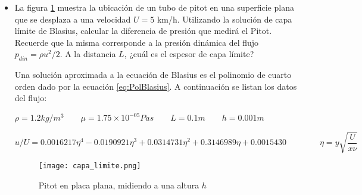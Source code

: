 \begin{itemize}
\item La figura \ref{fig:capa_limite} muestra la ubicación de un tubo de pitot en una superficie plana que se desplaza a una velocidad $U = 5$ km/h. Utilizando la solución de capa límite de Blasius, calcular la diferencia de presión que medirá el Pitot. Recuerde que la misma corresponde a la presión dinámica del flujo $p_{din} = \rho u^2/2$. A la distancia $L$, ¿cuál es el espesor de capa límite?

Una solución aproximada a la ecuación de Blasius es el polinomio de cuarto orden dado por la ecuación \ref{eq:PolBlasius}. A continuación se listan los datos del flujo:
\begin{center}
$\rho = 1.2 kg/m^3 \qquad \mu =1.75 \times 10^{-05} Pa s\qquad L = 0.1 m \qquad h = 0.001 m$
\end{center}

\begin{equation}\label{eq:PolBlasius}
u/U = 0.0016217 \eta^4 - 0.0190921 \eta^3 + 0.0314731 \eta^2 + 0.3146989 \eta + 0.0015430 \qquad \qquad \eta = y \sqrt{\frac{U}{x\nu}}
\end{equation}

\begin{figure}[h!!]
\centering
\texttt{[image: capa\_limite.png]}
\caption{Pitot en placa plana, midiendo a una altura $h$}
\label{fig:capa_limite}
\end{figure}


\end{itemize}
